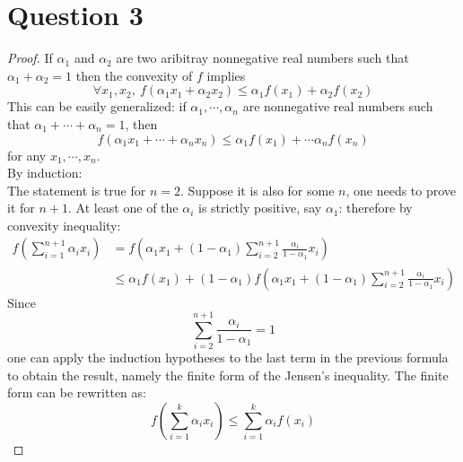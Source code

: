\documentclass{article}
\begin{document}
\section*{Question 3}
    \begin{proof}
        If $\alpha_1$ and $\alpha_2$ are two aribitray nonnegative real numbers such that $\alpha_1+\alpha_2=1$ then
        the convexity of $f$ implies
        $$ \forall x_1, x_2, \ f(\alpha_1 x_1 + \alpha_2 x_2) \leqslant \alpha_1 f(x_1) + \alpha_2 f(x_2) $$
        This can be easily generalized: if $\alpha_1, \cdots, \alpha_n$ are nonnegative real numbers such that
        $\alpha_1 + \cdots + \alpha_n = 1$, then
        $$f(\alpha_1 x_1 + \cdots + \alpha_n x_n) \leqslant \alpha_1 f(x_1) + \cdots \alpha_n f(x_n)$$
        for any $x_1, \cdots, x_n$.\\
        By induction:\\
        The statement is true for $n=2$. Suppose it is also for some $n$, one needs to prove it for $n+1$.
        At least one of the $\alpha_i$ is strictly positive, say $\alpha_1$: therefore by convexity inequality:
        \begin{align*}
            f\left(\sum_{i=1}^{n+1}\alpha_i x_i\right) &= f\left(\alpha_1 x_1 + (1-\alpha_1)\sum_{i=2}^{n+1}\frac{\alpha_i}{1-\alpha_1}x_i\right)\\
            &\leqslant \alpha_1 f(x_1) + (1-\alpha_1) f\left(\alpha_1 x_1 + (1-\alpha_1)\sum_{i=2}^{n+1}\frac{\alpha_i}{1-\alpha_1}x_i\right)
        \end{align*}
        Since $$ \sum_{i=2}^{n+1}\frac{\alpha_i}{1-\alpha_1} = 1 $$
        one can apply the induction hypotheses to the last term in the previous formula to obtain the result, namely the finite form of the Jensen's inequality.
        The finite form can be rewritten as:
        $$f\left(\sum_{i=1}^k \alpha_i x_i\right) \leqslant \sum_{i=1}^k \alpha_i f(x_i)$$
    \end{proof}

\end{document}

